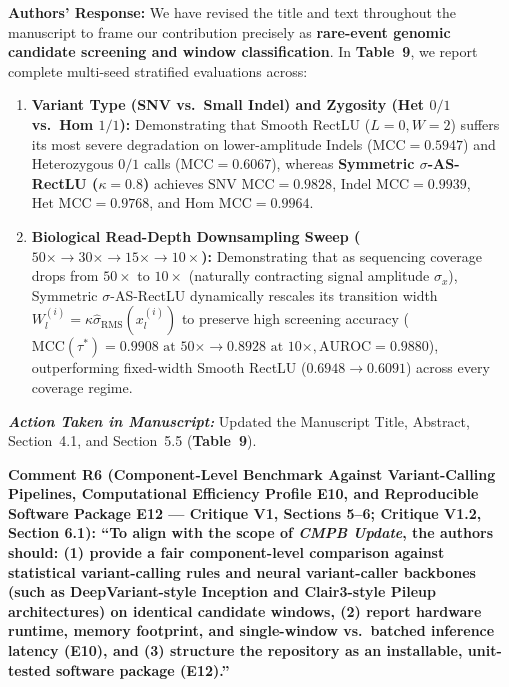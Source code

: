 \documentclass[11pt,a4paper]{article}
\newcommand{\revcomment}[1]{\vspace{0.8em}\noindent\textbf{\textcolor{blue!75!black}{#1}}\par\vspace{0.3em}}
\newcommand{\authorsresponse}{\noindent\textbf{Authors' Response: }}
\newcommand{\manuscriptchange}{\vspace{0.3em}\noindent\textit{\textbf{Action Taken in Manuscript: }}}
\begin{document}
\authorsresponse We have revised the title and text throughout the manuscript to frame our contribution precisely as \textbf{rare-event genomic candidate screening and window classification}. In \textbf{Table~9}, we report complete multi-seed stratified evaluations across:
\begin{enumerate}
    \item \textbf{Variant Type (SNV vs.\ Small Indel) and Zygosity (Het $0/1$ vs.\ Hom $1/1$):} Demonstrating that Smooth RectLU ($L=0, W=2$) suffers its most severe degradation on lower-amplitude Indels ($\text{MCC} = 0.5947$) and Heterozygous $0/1$ calls ($\text{MCC} = 0.6067$), whereas \textbf{Symmetric $\sigma$-AS-RectLU ($\kappa=0.8$)} achieves $\text{SNV MCC} = 0.9828$, $\text{Indel MCC} = 0.9939$, $\text{Het MCC} = 0.9768$, and $\text{Hom MCC} = 0.9964$.
    \item \textbf{Biological Read-Depth Downsampling Sweep ($50\times \to 30\times \to 15\times \to 10\times$):} Demonstrating that as sequencing coverage drops from $50\times$ to $10\times$ (naturally contracting signal amplitude $\sigma_x$), Symmetric $\sigma$-AS-RectLU dynamically rescales its transition width $W_l^{(i)} = \kappa\hat{\sigma}_{\text{RMS}}(x_l^{(i)})$ to preserve high screening accuracy ($\text{MCC}(\tau^*) = 0.9908 \text{ at } 50\times \to 0.8928 \text{ at } 10\times, \text{AUROC} = 0.9880$), outperforming fixed-width Smooth RectLU ($0.6948 \to 0.6091$) across every coverage regime.
\end{enumerate}

\manuscriptchange Updated the Manuscript Title, Abstract, Section~4.1, and Section~5.5 (\textbf{Table~9}).

\revcomment{Comment R6 (Component-Level Benchmark Against Variant-Calling Pipelines, Computational Efficiency Profile E10, and Reproducible Software Package E12 --- Critique V1, Sections 5--6; Critique V1.2, Section 6.1):
``To align with the scope of \textit{CMPB Update}, the authors should: (1) provide a fair component-level comparison against statistical variant-calling rules and neural variant-caller backbones (such as DeepVariant-style Inception and Clair3-style Pileup architectures) on identical candidate windows, (2) report hardware runtime, memory footprint, and single-window vs.\ batched inference latency (E10), and (3) structure the repository as an installable, unit-tested software package (E12).''}
\end{document}
